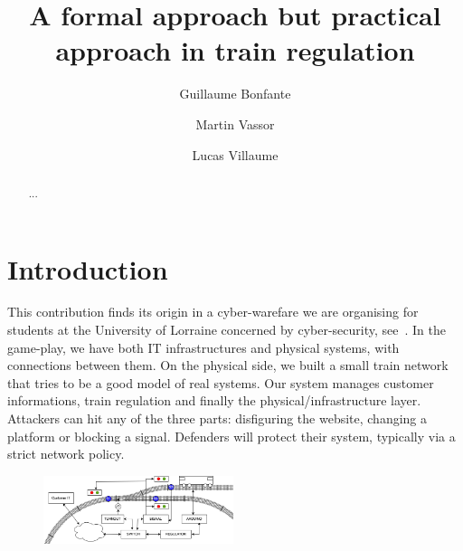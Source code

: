 \documentclass[runningheads]{llncs}
\begin{document}
%
\title{A formal approach but practical approach in train regulation}
%
%
\author{Guillaume Bonfante \and Martin Vassor  \and Lucas Villaume}
%
%
%
\maketitle
%
\begin{abstract}
	...

\end{abstract}


\section{Introduction}
\label{sec:introduction}

This contribution finds its origin in a cyber-warefare we are organising for students at the University of Lorraine concerned by cyber-security, see~\cite{CHE}. In the game-play, we have both IT infrastructures and physical systems, with connections between them. On the physical side, we built a small train network that tries to be a good model of real systems.  Our system manages customer informations, train regulation and finally the physical/infrastructure layer. Attackers can hit any of the three parts: disfiguring the website, changing a platform or blocking a signal. Defenders will protect their system, typically via a strict network policy.

\medskip

\begin{figure}
\vspace{-6mm}
\includegraphics[height=20mm]{TrainSchema.png}
\end{figure}
\end{document}
